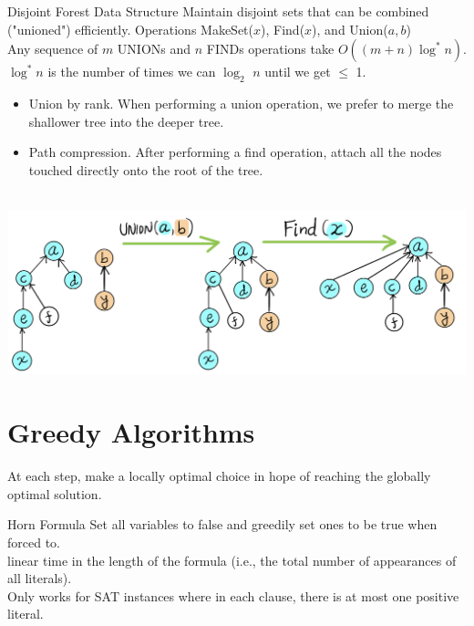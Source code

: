 \documentclass[10pt,a4paper]{article}
\begin{document}
\begin{multicols}{3}
    \begin{textbox}{Disjoint Forest Data Structure}
        Maintain disjoint sets that can be combined ("unioned") efficiently. Operations MakeSet($x$), Find($x$), and Union($a, b$)\\
        \linebreak
         Any sequence of $m$ UNIONs and $n$ FINDs operations take $O((m + n) \log^* n)$.\\
         $\log^* n$ is the number of times we can $\log_2$ $n$ until we get $\leq$ 1.\\
        \begin{itemize}
            \item Union by rank. When performing a union operation, we prefer to merge the shallower tree into the deeper tree.
            \item Path compression. After performing a find operation, attach all the nodes touched directly onto the root of the tree.
        \end{itemize}
        \\
        \includegraphics[width=\textwidth]{images/Union-Find.jpeg}
    \end{textbox}

    \section{Greedy Algorithms}

    \begin{textbox}{}
         At each step, make a locally optimal choice in hope of reaching the globally optimal solution. \\
    \end{textbox}
    \begin{textbox}{Horn Formula}
         Set all variables to false and greedily set ones to be true when forced to.\\
        \linebreak
         linear time in the length of the formula (i.e., the total number of appearances of all literals). \\
        \linebreak
         Only works for SAT instances where in each clause, there is at most one positive literal.
    \end{textbox}


\end{multicols}
\end{document}
